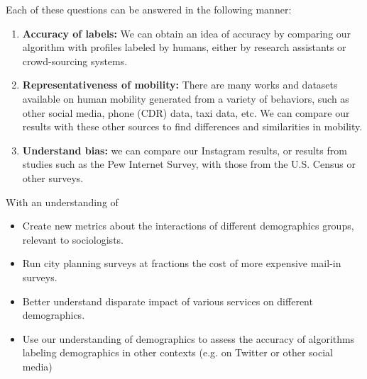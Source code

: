 \documentclass[12pt]{article}
\begin{document}
Each of these questions can be answered in the following manner:
\begin{enumerate}
  \item \textbf{Accuracy of labels:} We can obtain an idea of accuracy by comparing our algorithm with profiles labeled by humans, either by research assistants or crowd-sourcing systems.
  \item \textbf{Representativeness of mobility:} There are many works and datasets available on human mobility generated from a variety of behaviors, such as other social media, phone (CDR) data, taxi data, etc. We can compare our results with these other sources to find differences and similarities in mobility.
  \item \textbf{Understand bias:} we can compare our Instagram results, or results from studies such as the Pew Internet Survey, with those from the U.S. Census or other surveys.
\end{enumerate}

With an understanding of 
\begin{itemize}
  \item Create new metrics about the interactions of different demographics groups, relevant to sociologists.
  \item Run city planning surveys at fractions the cost of more expensive mail-in surveys.
  \item Better understand disparate impact of various services on different demographics.
  \item Use our understanding of demographics to assess the accuracy of algorithms labeling demographics in other contexts (e.g. on Twitter or other social media)
\end{itemize}






\end{document}
